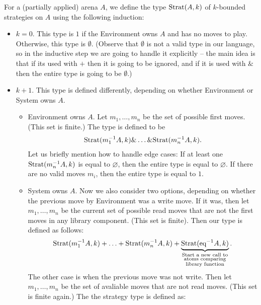 \begin{definition}
    For a (partially applied) arena $A$, we define the type $\text{Strat}(A, k)$ of $k$-bounded strategies on $A$ using the following induction:
\begin{itemize}
    \item $k=0$. This type is $1$ if the Environment owns $A$ and has no moves to play. Otherwise, this type is $\emptyset$.
          (Observe that $\emptyset$ is not a valid type in our language, so in the inductive step we are going to handle it explicitly --
          the main idea is that if its used with $+$ then it is going to be ignored,
          and if it is used with $\&$ then the entire type is going to be $\emptyset$.) 
    \item $k + 1$. This type is defined differently, depending on whether Environment or System owns $A$.
    \begin{itemize}
        \item Environment owns $A$. Let $m_1,\ldots,m_n$ be the set of possible first moves. (This set is finite.) The type is defined to be 
        \begin{align*}
            \text{Strat}(m_1^{-1}A, k) \& \ldots \& \text{Strat}(m_n^{-1}A, k).
        \end{align*}
        Let us briefly mention how to handle edge cases: If at least one $\text{Strat}(m_n^{-1}A, k)$ is equal to $\varnothing$, then 
        the entire type is equal to $\varnothing$. If there are no valid moves $m_i$, then the entire type is equal to $1$. 
        \item System owns $A$. Now we also consider two options, depending on whether the previous move by Environment was a write move. 
               If it was, then let $m_1, \ldots, m_n$ be the current set of possible read moves that are not the first moves in any library 
               component. (This set is finite). Then our type is defined as follows:
               \begin{align*}
                \text{Strat}(m_1^{-1}A, k) + \ldots + \text{Strat}(m_n^{-1}A, k) + \underbrace{\text{Strat}({\text{eq}}^{-1}A, k)}_{\substack{\textrm{Start a new call to}\\
                \textrm{atoms comparing}\\
                \textrm{library function}}}.
               \end{align*}
               The other case is when the previous move was not write. Then let $m_1, \ldots, m_n$ be the set of avaliable moves that are not read moves. 
               (This set is finite again.) The the strategy type is defined as: 

\end{itemize}
\end{itemize}
\end{definition}
